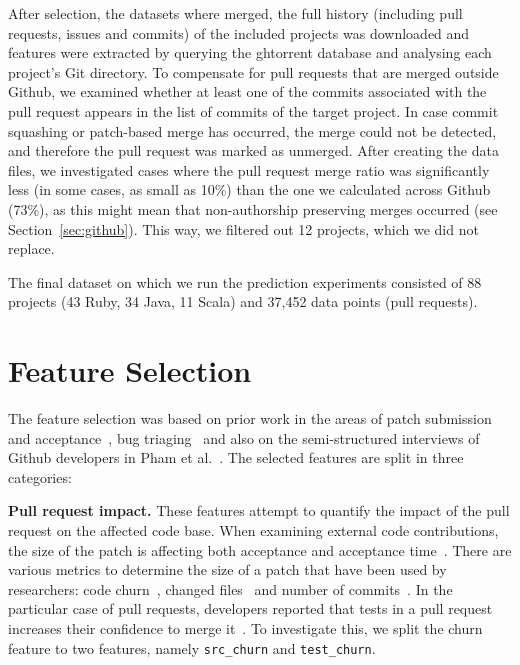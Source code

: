 \documentclass{sig-alternate}
\begin{document}
After selection, the datasets where merged, the full history (including pull
requests, issues and commits) of the included projects was downloaded and
features were extracted by querying the {\sc ght}orrent database and analysing
each project's Git directory.
To compensate for pull requests that are merged
outside Github, we examined whether at least one of the commits associated
with the pull request appears in the list of commits of the target project. In
case commit squashing or patch-based merge has occurred, the merge could not be
detected, and therefore the pull request was marked as unmerged.
After creating the data files, we investigated
cases where the pull request merge ratio was significantly less (in some cases,
as small as 10\%) than the one we calculated across Github (73\%), as this might
mean that non-authorship preserving merges occurred (see Section~\ref{sec:github}). This way, we filtered out 12 projects, which we did not replace. 

The final dataset on which we run the prediction experiments consisted of 88
projects (43 Ruby, 34 Java, 11 Scala) and 37,452 data points (pull requests).
%



\section{Feature Selection}
\label{sec:featureselection}

The feature selection was based on prior work in the areas of patch submission
and acceptance~\cite{Nagap05,Bird07a,Weiss08,Baysa12}, bug
triaging~\cite{Anvik06, Giger10} and also on the semi-structured interviews of
Github developers in Pham et al.~\cite{Pham13}. The selected features are split
in three categories:


  \textbf{Pull request impact.} These
    features attempt to quantify the impact of the
    pull request on the affected code base. When examining external code
    contributions, the size of the patch is affecting both acceptance and
    acceptance time~\cite{Weiss08}. There are various metrics to determine the
    size of a patch that have been used by researchers: code
    churn~\cite{Nagap05, Ratzi07}, changed files~\cite{Nagap05} and number of
    commits~\cite{Fluri07}. In the particular case of pull requests, developers
    reported that tests in a pull request increases their confidence to merge
    it~\cite{Pham13}. To investigate this, we split the churn feature to two
    features, namely \texttt{src\_churn} and \texttt{test\_churn}.
\end{document}
